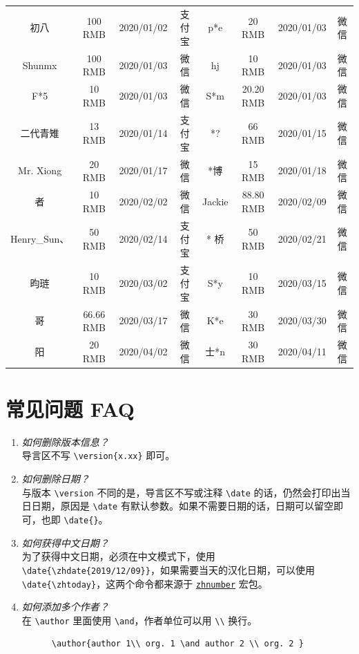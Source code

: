 \documentclass[cn,hazy,blue,10.5pt,normal]{elegantnote}
\begin{document}
\begin{table}[htbp]
\begin{tabular}{*{8}{>{\scriptsize}c}}
    初八    & 100 RMB  & 2020/01/02 & 支付宝   & p*e   & 20 RMB & 2020/01/03 & 微信 \\
    Shunmx & 100 RMB & 2020/01/03 & 微信    & hj    & 10 RMB & 2020/01/03 & 微信 \\
    F*5   & 10 RMB & 2020/01/03 & 微信    & S*m   & 20.20 RMB & 2020/01/03 & 微信 \\
    二代青雉  & 13 RMB & 2020/01/14 & 支付宝   & *?    & 66 RMB & 2020/01/15 & 微信 \\
    Mr. Xiong & 20 RMB & 2020/01/17 & 微信    & *博    & 15 RMB & 2020/01/18 & 微信 \\
    * 者  & 10 RMB & 2020/02/02 & 微信    & Jackie  &  88.80 RMB  &  2020/02/09 & 微信 \\
    Henry\_Sun、 & 50 RMB & 2020/02/14 & 支付宝 & * 桥  & 50 RMB & 2020/02/21 & 微信 \\
    昀琏 & 10 RMB & 2020/03/02 & 支付宝 & S*y  &  10 RMB  &  2020/03/15 & 微信 \\
    * 哥  & 66.66 RMB & 2020/03/17 & 微信    &   K*e & 30 RMB & 2020/03/30 & 微信\\
    * 阳  &  20 RMB  &  2020/04/02 & 微信 & 士*n  & 30 RMB & 2020/04/11 & 微信 \\
    \bottomrule
    \end{tabular}%
  \label{tab:donation}%
\end{table}%


\section{常见问题 FAQ}

\begin{enumerate}[label=\arabic*).]
  \item \textit{如何删除版本信息？}\\
    导言区不写 \lstinline|\version{x.xx}| 即可。
  \item \textit{如何删除日期？}\\
    与版本 \lstinline{\version} 不同的是，导言区不写或注释 \lstinline{\date} 的话，仍然会打印出当日日期，原因是 \lstinline{\date} 有默认参数。如果不需要日期的话，日期可以留空即可，也即 \lstinline|\date{}|。
  \item \textit{如何获得中文日期？}\\
    为了获得中文日期，必须在中文模式下，使用 \lstinline|\date{\zhdate{2019/12/09}}|，如果需要当天的汉化日期，可以使用 \lstinline|\date{\zhtoday}|，这两个命令都来源于 \href{https://ctan.org/pkg/zhnumber}{\lstinline{zhnumber}} 宏包。
  \item \textit{如何添加多个作者？}\\
    在 \lstinline{\author} 里面使用 \lstinline{\and}，作者单位可以用 \lstinline{\\} 换行。
    \begin{lstlisting}
      \author{author 1\\ org. 1 \and author 2 \\ org. 2 }
    \end{lstlisting}
\end{enumerate}
\end{document}
